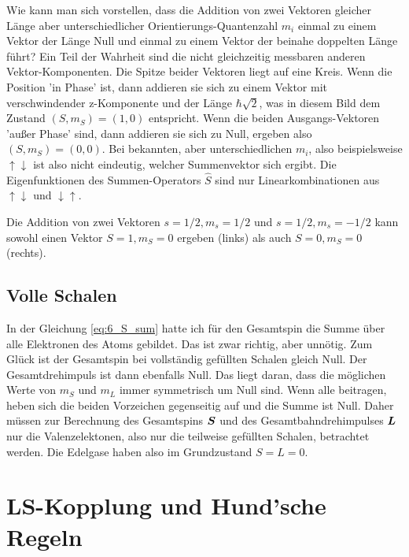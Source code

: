 Wie kann man sich vorstellen, dass die Addition von zwei Vektoren gleicher Länge aber unterschiedlicher Orientierungs-Quantenzahl $m_i$ einmal zu einem Vektor der Länge Null und einmal zu einem Vektor der beinahe doppelten Länge führt? Ein Teil der Wahrheit sind die nicht gleichzeitig messbaren anderen Vektor-Komponenten. Die Spitze beider Vektoren liegt auf eine Kreis. Wenn die Position 'in Phase' ist, dann addieren sie sich zu einem Vektor mit verschwindender z-Komponente und der Länge $\hbar \sqrt{2}$, was in diesem Bild dem Zustand $(S, m_S) = (1,0)$ entspricht. Wenn die beiden Ausgangs-Vektoren 'außer Phase' sind, dann addieren sie sich zu Null, ergeben also  $(S, m_S) = (0,0)$. Bei bekannten, aber unterschiedlichen $m_i$, also beispielsweise $\uparrow \downarrow$ ist also nicht eindeutig, welcher Summenvektor sich ergibt. Die Eigenfunktionen des Summen-Operators $\hat{S}$ sind nur Linearkombinationen aus $\uparrow \downarrow$ und $\downarrow \uparrow$.

\begin{marginfigure}
\vspace*{2mm}

\caption{Die Addition von zwei Vektoren $s=1/2, m_s = 1/2$ und  $s=1/2, m_s = -1/2$ kann sowohl einen Vektor   $S=1, m_S = 0$ ergeben (links) als auch $S=0, m_S = 0$ (rechts).}
\end{marginfigure}

\subsection{Volle Schalen}

In der Gleichung \ref{eq:6_S_sum} hatte ich für den Gesamtspin die Summe über alle Elektronen des Atoms gebildet. Das ist zwar richtig, aber unnötig. Zum Glück ist der Gesamtspin bei vollständig gefüllten Schalen gleich Null. Der Gesamtdrehimpuls ist dann ebenfalls Null. Das liegt daran, dass die möglichen Werte von $m_S$ und $m_L$ immer symmetrisch um Null sind. Wenn alle beitragen, heben sich die beiden Vorzeichen gegenseitig auf und die Summe ist Null. Daher müssen zur Berechnung des Gesamtspins $\boldsymbol{S}$ und des Gesamtbahndrehimpulses $\boldsymbol{L}$ nur die Valenzelektonen, also nur die teilweise gefüllten Schalen, betrachtet werden. Die Edelgase haben also im Grundzustand $S=L=0$.


\section{LS-Kopplung und Hund'sche Regeln}

